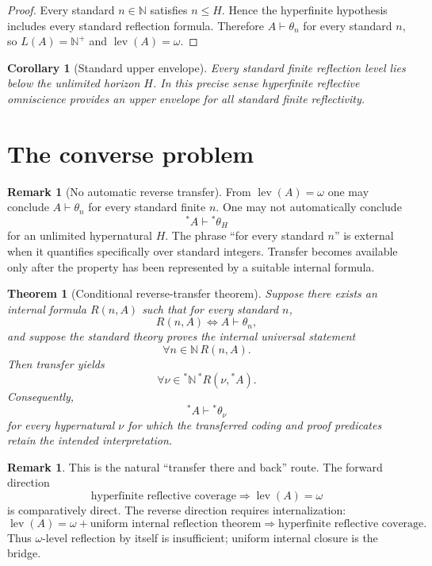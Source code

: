 \documentclass[11pt]{article}
\theoremstyle{definition}
\newtheorem{remark}[definition]{Remark}
\theoremstyle{plain}
\newtheorem{theorem}[definition]{Theorem}
\newtheorem{corollary}[definition]{Corollary}
\newcommand{\lev}{\operatorname{lev}}
\begin{document}
\begin{proof}
Every standard $n\in\mathbb N$ satisfies $n\le H$. Hence the hyperfinite hypothesis includes every standard reflection formula. Therefore $A\vdash\theta_n$ for every standard $n$, so $L(A)=\mathbb N^+$ and $\lev(A)=\omega$.
\end{proof}

\begin{corollary}[Standard upper envelope]
Every standard finite reflection level lies below the unlimited horizon $H$. In this precise sense hyperfinite reflective omniscience provides an upper envelope for all standard finite reflectivity.
\end{corollary}

\section{The converse problem}

\begin{remark}[No automatic reverse transfer]
From $\lev(A)=\omega$ one may conclude $A\vdash\theta_n$ for every standard finite $n$. One may not automatically conclude
\[
{}^*A\vdash{}^*\theta_H
\]
for an unlimited hypernatural $H$. The phrase ``for every standard $n$'' is external when it quantifies specifically over standard integers. Transfer becomes available only after the property has been represented by a suitable internal formula.
\end{remark}

\begin{theorem}[Conditional reverse-transfer theorem]
Suppose there exists an internal formula $R(n,A)$ such that for every standard $n$,
\[
R(n,A)\Longleftrightarrow A\vdash\theta_n,
\]
and suppose the standard theory proves the internal universal statement
\[
\forall n\in\mathbb N\,R(n,A).
\]
Then transfer yields
\[
\forall\nu\in{}^*\mathbb N\,{}^*R(\nu,{}^*A).
\]
Consequently,
\[
{}^*A\vdash{}^*\theta_\nu
\]
for every hypernatural $\nu$ for which the transferred coding and proof predicates retain the intended interpretation.
\end{theorem}

\begin{remark}
This is the natural ``transfer there and back'' route. The forward direction
\[
\text{hyperfinite reflective coverage}\Longrightarrow\lev(A)=\omega
\]
is comparatively direct. The reverse direction requires internalization:
\[
\lev(A)=\omega+\text{uniform internal reflection theorem}
\Longrightarrow\text{hyperfinite reflective coverage}.
\]
Thus $\omega$-level reflection by itself is insufficient; uniform internal closure is the bridge.
\end{remark}
\end{document}
